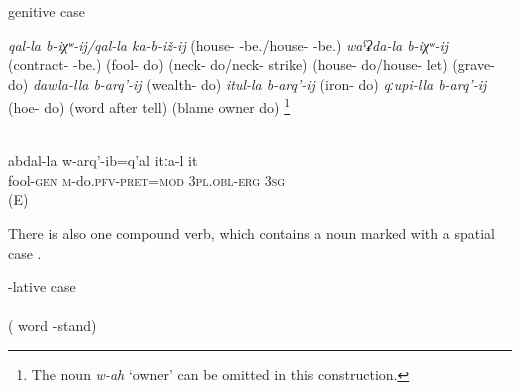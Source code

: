 %
\begin{exe}
	\ex	genitive case	\label{ex:markednouncpgenitive}
	\begin{xlist}
		\ex \label{ex:markednouncpgenitiveget married} \textit{qal-la b-iχʷ-ij\slash qal-la ka-b-iž-ij} (house- -be.\slash house- -be.)  
		\ex \textit{waˁʡda-la b-iχʷ-ij} (contract- -be.) 
	\ex	{} (fool- do)  
	\ex	{} (neck- do\slash neck- strike) 
	\ex	{} (house- do\slash house- let) 
	\ex	{} (grave- do) 
	\ex \textit{dawla-lla b-arq'-ij} (wealth- do) 
	\ex \textit{itul-la b-arq'-ij} (iron- do)  \label{ex:IRON}
	\ex \textit{qːupi-lla b-arq'-ij} (hoe- do) 	\label{ex:WEED}
	\ex	{}  (word after tell) \label{exGossip}
	\ex	{} (blame owner do)  \footnote{The noun \textit{w-ah} `owner' can be omitted in this construction.} \label{ex:considerguilty} 
	\end{xlist}
\end{exe}

\begin{exe}
		\ex	{}  \label{ex:They took him for a foolCOMPOUND}\\
		\gll	abdal-la	w-arq'-ib=q'al	itːa-l	it\\
			fool-\textsc{gen}	\textsc{m}-do.\textsc{pfv}-\textsc{pret}=\textsc{mod}	3\textsc{pl}.\textsc{obl}-\textsc{erg}	3\textsc{sg}\\
		\glt	{} (E)
\end{exe}

There is also one compound verb, which contains a noun marked with a spatial case .

\begin{exe}
			\ex	{}-lative case	\label{ex:markednouncplocative} \\   \\
			( word -stand) 
\end{exe}



